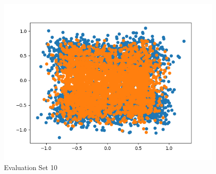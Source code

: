 \documentclass{article}
\begin{document}
\begin{figure}[H]
\begin{minipage}{.33\textwidth}
			\includegraphics[width=1\linewidth]{../EvalSet 10.png}
			\caption{Evaluation Set 10}
	\end{minipage}\hfill
\end{figure}
\end{document}
